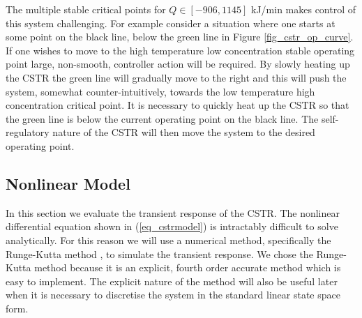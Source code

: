\documentclass[../masters.tex]{subfiles}
\begin{document}
The multiple stable critical points for $Q\in [-906, 1145]$ kJ/min makes control of this system challenging. For example consider a situation where one starts at some point on the black line, below the green line in Figure \ref{fig_cstr_op_curve}. If one wishes to move to the high temperature low concentration stable operating point large, non-smooth, controller action will be required. By slowly heating up the CSTR the green line will gradually move to the right and this will push the system, somewhat counter-intuitively, towards the low temperature high concentration critical point. It is necessary to quickly heat up the CSTR so that the green line is below the current operating point on the black line. The self-regulatory nature of the CSTR will then move the system to the desired operating point.   

\subsection{Nonlinear Model}
In this section we evaluate the transient response of the CSTR. The nonlinear differential equation shown in (\ref{eq_cstrmodel}) is intractably difficult to solve analytically. For this reason we will use a numerical method, specifically the Runge-Kutta method \cite{edwardsandpenny}, to simulate the transient response. We chose the Runge-Kutta method because it is an explicit, fourth order accurate method which is easy to implement. The explicit nature of the method will also be useful later when it is necessary to discretise the system in the standard linear state space form.
\end{document}
